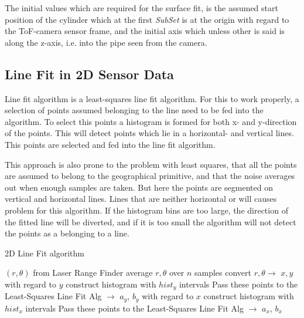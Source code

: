The initial values which are required for the surface fit, is the assumed start position
of the cylinder which at the first \emph{SubSet} is at the origin with regard to the
ToF-camera sensor frame, and the initial axis which unless other is said is along the
z-axis, i.e. into the pipe seen from the camera.


\subsection{Line Fit in 2D Sensor Data}
Line fit algorithm is a least-squares line fit algorithm. For this to work properly, a
selection of points assumed belonging to the line need to be fed into the algorithm. To
select this points a histogram is formed for both x- and y-direction of the points. This
will detect points which lie in a horizontal- and vertical lines. This points are selected
and fed into the line fit algorithm. 

This approach is also prone to the problem with least squares, that all the points are
assumed to belong to the geographical primitive, and that the noise averages out when
enough samples are taken. But here the points are segmented on vertical and horizontal
lines. Lines that are neither horizontal or will causes problem for this algorithm. If the
histogram bins are too large, the direction of the fitted line will be diverted, and if it
is too small the algorithm will not detect the points as a belonging to a line. 
\begin{algorithm}[htbp]
    \caption{2D Line Fit algorithm}
    \label{chap5:alg-2dlinefit}
    \begin{algorithmic}
        \REQUIRE $(r, \theta)$ from Laser Range Finder
        \STATE average $r, \theta$ over $n$ samples
        \STATE convert $r, \theta \rightarrow$ $x, y$ 
        \STATE with regard to $y$ construct histogram with $hist_y$ intervals
                \STATE Pass these points to the Least-Squares Line Fit Alg $\rightarrow$ $a_y$, $b_y$
            \ENDIF
        \ENDFOR
        \STATE with regard to $x$ construct histogram with $hist_x$ intervals
                \STATE Pass these points to the Least-Squares Line Fit Alg $\rightarrow$ $a_x$, $b_x$
            \ENDIF
        \ENDFOR
    \end{algorithmic}
\end{algorithm}

